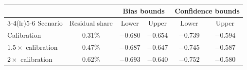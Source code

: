 \begin{tabular}{lccccc}
\toprule
 & & \multicolumn{2}{c}{Bias bounds} & \multicolumn{2}{c}{Confidence bounds}\\
\cmidrule(lr){3-4}\cmidrule(lr){5-6}
Scenario & Residual share & Lower & Upper & Lower & Upper\\
\midrule
Calibration & 0.31\% & $-0.680$ & $-0.654$ & $-0.739$ & $-0.594$\\
$1.5\times$ calibration & 0.47\% & $-0.687$ & $-0.647$ & $-0.745$ & $-0.587$\\
$2\times$ calibration & 0.62\% & $-0.693$ & $-0.640$ & $-0.752$ & $-0.580$\\
\bottomrule
\end{tabular}
